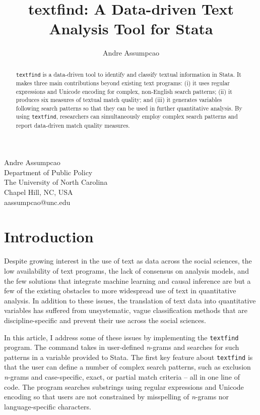 
\author{Andre Assumpcao}{Andre Assumpcao\\Department of Public Policy\\The University of North Carolina\\Chapel Hill, NC, USA\\aassumpcao@unc.edu}
\title[textfind]{textfind: A Data-driven Text Analysis Tool for Stata}

\maketitle

\begin{abstract}
{\tt textfind} is a data-driven tool to identify and classify textual information in Stata. It makes three main contributions beyond existing text programs: (i) it uses regular expressions and Unicode encoding for complex, non-English search patterns; (ii) it produces six measures of textual match quality; and (iii) it generates variables following search patterns so that they can be used in further quantitative analysis. By using {\tt textfind}, researchers can simultaneously employ complex search patterns and report data-driven match quality measures.

\end{abstract}

\section[Introduction]{Introduction} \label{sec:1}
Despite growing interest in the use of text as data across the social sciences, the low availability of text programs, the lack of consensus on analysis models, and the few solutions that integrate machine learning and causal inference are but a few of the existing obstacles to more widespread use of text in quantitative analysis. In addition to these issues, the translation of text data into quantitative variables has suffered from unsystematic, vague classification methods that are discipline-specific and prevent their use across the social sciences.

In this article, I address some of these issues by implementing the {\tt textfind} program. The command takes in user-defined {\it n}-grams and searches for such patterns in a variable provided to Stata. The first key feature about {\tt textfind} is that the user can define a number of complex search patterns, such as exclusion {\it n}-grams and case-specific, exact, or partial match criteria -- all in one line of code. The program searches substrings using regular expressions and Unicode encoding so that users are not constrained by misspelling of {\it n}-grams nor language-specific characters.

